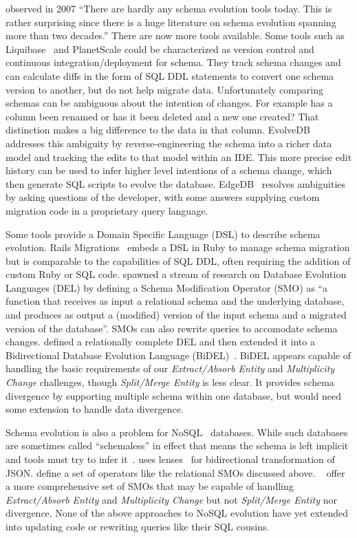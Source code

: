 \documentclass[english,submission]{programming}
\begin{document}
\citet{bernstein07} observed in 2007 ``There are hardly any schema evolution tools today. This is rather surprising since there is a huge literature on schema evolution spanning more than two decades.'' There are now more tools available. Some tools such as Liquibase~\cite{liquibase} and PlanetScale\cite{planetscale} could be characterized as version control and continuous integration/deployment for schema. They track schema changes and can calculate diffs in the form of SQL DDL statements to convert one schema version to another, but do not help migrate data. Unfortunately comparing schemas can be ambiguous about the intention of changes. For example has a column been renamed or has it been deleted and a new one created? That distinction makes a big difference to the data in that column. EvolveDB\cite{evolvedb} addresses this ambiguity by reverse-engineering the schema into a richer data model and tracking the edits to that model within an IDE. This more precise edit history can be used to infer higher level intentions of a schema change, which then generate SQL scripts to evolve the database. EdgeDB~\cite{edgedb} resolves ambiguities by asking questions of the developer, with some answers supplying custom migration code in a proprietary query language.

Some tools provide a Domain Specific Language (DSL) to describe schema evolution. Rails Migrations~\cite{RailsMigrations} embeds a DSL in Ruby to manage schema migration but is comparable to the capabilities of SQL DDL, often requiring the addition of custom Ruby or SQL code. \citet{curino08} spawned a stream of research on Database Evolution Languages (DEL) by defining a Schema Modification Operator (SMO) as ``a function that receives as input a relational schema and the underlying database, and produces as output a (modified) version of the input schema and a migrated version of the database''. SMOs can also rewrite queries to accomodate schema changes. \citet{herrmann15} defined a relationally complete DEL and then extended it into a Bidirectional Database Evolution Language (BiDEL)~\cite{herrmann17}. BiDEL appears capable of handling the basic requirements of our \textit{Extract/Absorb Entity} and \textit{Multiplicity Change} challenges, though \textit{Split/Merge Entity} is less clear. It provides schema divergence by supporting multiple schema within one database, but would need some extension to handle data divergence.

Schema evolution is also a problem for NoSQL~\cite{sadalage12} databases. While such databases are sometimes called ``schemaless'' in effect that means the schema is left implicit and tools must try to infer it~\cite{storl20, storl22}. \citet{Cambria} uses lenses~\cite{Foster2007} for bidirectional transformation of JSON. \citet{scherzinger13} define a set of operators like the relational SMOs discussed above. \citeauthor*{chillon21}~\cite{chillon21, chillon22} offer a more comprehensive set of SMOs that may be capable of handling \textit{Extract/Absorb Entity} and \textit{Multiplicity Change} but not \textit{Split/Merge Entity} nor divergence. None of the above approaches to NoSQL evolution have yet extended into updating code or rewriting queries like their SQL cousins.
\end{document}
